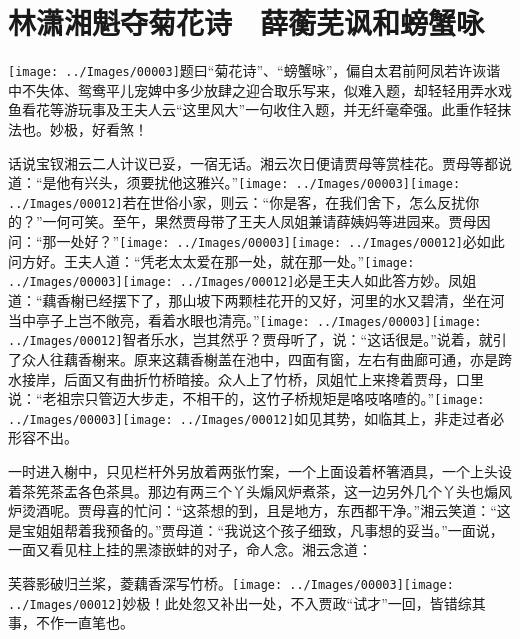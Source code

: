 

\chapter{林潇湘魁夺菊花诗　薛蘅芜讽和螃蟹咏}\label{part0042_split_000.htmlux5cux23calibre_pb_0}

{\texttt{[image: ../Images/00003]}题曰``菊花诗''、``螃蟹咏''，偏自太君前阿凤若许诙谐中不失体、鸳鸯平儿宠婢中多少放肆之迎合取乐写来，似难入题，却轻轻用弄水戏鱼看花等游玩事及王夫人云``这里风大''一句收住入题，并无纤毫牵强。此重作轻抹法也。妙极，好看煞！}

话说宝钗湘云二人计议已妥，一宿无话。湘云次日便请贾母等赏桂花。贾母等都说道：``是他有兴头，须要扰他这雅兴。''{\texttt{[image: ../Images/00003]}\texttt{[image: ../Images/00012]}\footnotesize \kaishu 若在世俗小家，则云：``你是客，在我们舍下，怎么反扰你的？''一何可笑。}至午，果然贾母带了王夫人凤姐兼请薛姨妈等进园来。贾母因问：``那一处好？''{\texttt{[image: ../Images/00003]}\texttt{[image: ../Images/00012]}\footnotesize \kaishu 必如此问方好。}王夫人道：``凭老太太爱在那一处，就在那一处。''{\texttt{[image: ../Images/00003]}\texttt{[image: ../Images/00012]}\footnotesize \kaishu 必是王夫人如此答方妙。}凤姐道：``藕香榭已经摆下了，那山坡下两颗桂花开的又好，河里的水又碧清，坐在河当中亭子上岂不敞亮，看着水眼也清亮。''{\texttt{[image: ../Images/00003]}\texttt{[image: ../Images/00012]}\footnotesize \kaishu 智者乐水，岂其然乎？}贾母听了，说：``这话很是。''说着，就引了众人往藕香榭来。原来这藕香榭盖在池中，四面有窗，左右有曲廊可通，亦是跨水接岸，后面又有曲折竹桥暗接。众人上了竹桥，凤姐忙上来搀着贾母，口里说：``老祖宗只管迈大步走，不相干的，这竹子桥规矩是咯吱咯喳的。''{\texttt{[image: ../Images/00003]}\texttt{[image: ../Images/00012]}\footnotesize \kaishu 如见其势，如临其上，非走过者必形容不出。}

一时进入榭中，只见栏杆外另放着两张竹案，一个上面设着杯箸酒具，一个上头设着茶筅茶盂各色茶具。那边有两三个丫头煽风炉煮茶，这一边另外几个丫头也煽风炉烫酒呢。贾母喜的忙问：``这茶想的到，且是地方，东西都干净。''湘云笑道：``这是宝姐姐帮着我预备的。''贾母道：``我说这个孩子细致，凡事想的妥当。''一面说，一面又看见柱上挂的黑漆嵌蚌的对子，命人念。湘云念道：

芙蓉影破归兰桨，菱藕香深写竹桥。{\texttt{[image: ../Images/00003]}\texttt{[image: ../Images/00012]}\footnotesize \kaishu 妙极！此处忽又补出一处，不入贾政``试才''一回，皆错综其事，不作一直笔也。}

